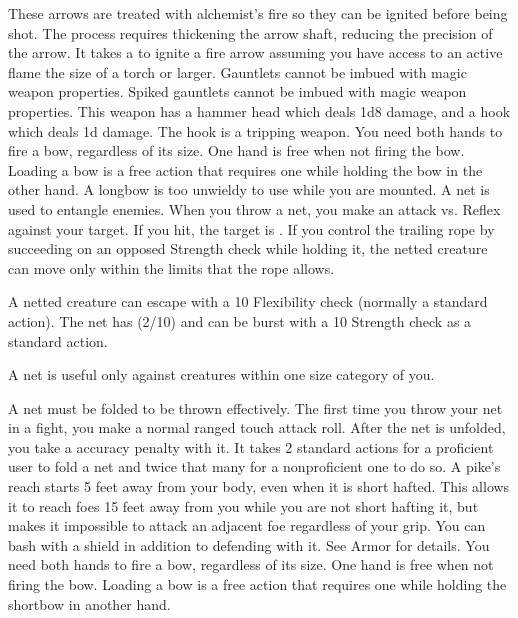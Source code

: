          These arrows are treated with alchemist's fire so they can be ignited before being shot.
        The process requires thickening the arrow shaft, reducing the precision of the arrow.
        It takes a  to ignite a fire arrow assuming you have access to an active flame the size of a torch or larger.
         Gauntlets cannot be imbued with magic weapon properties.
         Spiked gauntlets cannot be imbued with magic weapon properties.
         This weapon has a hammer head which deals 1d8 damage, and a hook which deals \minus1d damage. The hook is a tripping weapon.
         You need both hands to fire a bow, regardless of its size. One hand is free when not firing the bow. Loading a bow is a free action that requires one  while holding the bow in the other hand. A longbow is too unwieldy to use while you are mounted.
         A net is used to entangle enemies. When you throw a net, you make an attack vs. Reflex against your target. If you hit, the target is \slowed. If you control the trailing rope by succeeding on an opposed Strength check while holding it, the netted creature can move only within the limits that the rope allows.
        \par A netted creature can escape with a  10 Flexibility check (normally a standard action). The net has (2/10) and can be burst with a  10 Strength check as a standard action.
        \par A net is useful only against creatures within one size category of you.
        \par A net must be folded to be thrown effectively. The first time you throw your net in a fight, you make a normal ranged touch attack roll. After the net is unfolded, you take a  accuracy penalty with it. It takes 2 standard actions for a proficient user to fold a net and twice that many for a nonproficient one to do so.
         A pike's reach starts 5 feet away from your body, even when it is short hafted.
        This allows it to reach foes 15 feet away from you while you are not short hafting it, but makes it impossible to attack an adjacent foe regardless of your grip.
         You can bash with a shield in addition to defending with it. See Armor for details.
         You need both hands to fire a bow, regardless of its size. One hand is free when not firing the bow. Loading a bow is a free action that requires one  while holding the shortbow in another hand.
